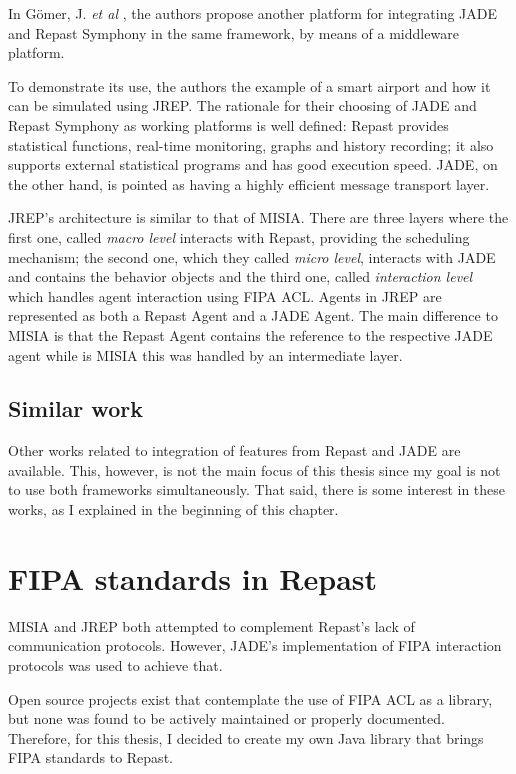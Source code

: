 	In Gömer, J. \textit{et al} \cite{gormer2011jrep}, the authors propose another platform for integrating JADE and Repast Symphony in the same framework, by means of a middleware platform.

	To demonstrate its use, the authors the example of a smart airport and how it can be simulated using JREP.
	The rationale for their choosing of JADE and Repast Symphony as working platforms is well defined:
	Repast provides statistical functions, real-time monitoring, graphs and history recording; it also supports external statistical programs and has good execution speed.
	JADE, on the other hand, is pointed as having a highly efficient message transport layer. 

	JREP's architecture is similar to that of MISIA. There are three layers where the first one, called \textit{macro level} interacts with Repast, providing the scheduling mechanism; the second one, which they called \textit{micro level}, interacts with JADE and contains the behavior objects and the third one, called \textit{interaction level} which handles agent interaction using FIPA ACL.
	Agents in JREP are represented as both a Repast Agent and a JADE Agent. The main difference to MISIA is that the Repast Agent contains the reference to the respective JADE agent while is MISIA this was handled by an intermediate layer.

\subsection{Similar work}
	Other works related to integration of features from Repast and JADE are available. This, however, is not the main focus of this thesis since my goal is not to use both frameworks simultaneously. That said, there is some interest in these works, as I explained in the beginning of this chapter. 



\section{FIPA standards in Repast}
	MISIA and JREP both attempted to complement Repast's lack of communication protocols. However, JADE's implementation of FIPA interaction protocols was used to achieve that. 

	Open source projects exist that contemplate the use of FIPA ACL as a library, but none was found to be actively maintained or properly documented. Therefore, for this thesis, I decided to create my own Java library that brings FIPA standards to Repast.


